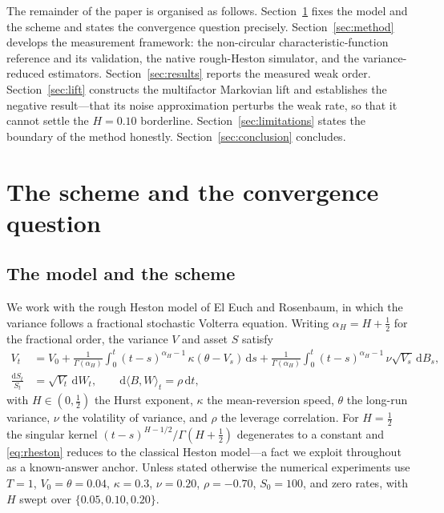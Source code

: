 \documentclass[11pt]{article}
\theoremstyle{plain}
\theoremstyle{definition}
\begin{document}
The remainder of the paper is organised as follows.
Section~\ref{sec:scheme} fixes the model and the scheme and states the convergence
question precisely. Section~\ref{sec:method} develops the measurement framework:
the non-circular characteristic-function reference and its validation, the native
rough-Heston simulator, and the variance-reduced estimators.
Section~\ref{sec:results} reports the measured weak order.
Section~\ref{sec:lift} constructs the multifactor Markovian lift and establishes the
negative result---that its noise approximation perturbs the weak rate, so that it
cannot settle the $H=0.10$ borderline.
Section~\ref{sec:limitations} states the boundary of the method honestly.
Section~\ref{sec:conclusion} concludes.

\section{The scheme and the convergence question}\label{sec:scheme}

\subsection{The model and the scheme}

We work with the rough Heston model of El Euch and Rosenbaum, in which the variance
follows a fractional stochastic Volterra equation. Writing $\alpha_{\!H}=H+\tfrac12$
for the fractional order, the variance $V$ and asset $S$ satisfy
\begin{align}
V_t &= V_0 + \frac{1}{\Gamma(\alpha_{\!H})}\int_0^t (t-s)^{\alpha_{\!H}-1}\,
       \kappa(\theta - V_s)\,\mathrm{d}s
     + \frac{1}{\Gamma(\alpha_{\!H})}\int_0^t (t-s)^{\alpha_{\!H}-1}\,
       \nu\sqrt{V_s}\,\mathrm{d}B_s, \label{eq:rheston}\\
\frac{\mathrm{d}S_t}{S_t} &= \sqrt{V_t}\,\mathrm{d}W_t,
\qquad \mathrm{d}\langle B,W\rangle_t = \rho\,\mathrm{d}t,
\end{align}
with $H\in(0,\tfrac12)$ the Hurst exponent, $\kappa$ the mean-reversion speed,
$\theta$ the long-run variance, $\nu$ the volatility of variance, and $\rho$ the
leverage correlation. For $H=\tfrac12$ the singular kernel
$(t-s)^{H-1/2}/\Gamma(H+\tfrac12)$ degenerates to a constant and \eqref{eq:rheston}
reduces to the classical Heston model---a fact we exploit throughout as a known-answer
anchor. Unless stated otherwise the numerical experiments use
$T=1$, $V_0=\theta=0.04$, $\kappa=0.3$, $\nu=0.20$, $\rho=-0.70$, $S_0=100$, and zero
rates, with $H$ swept over $\{0.05,0.10,0.20\}$.
\end{document}
